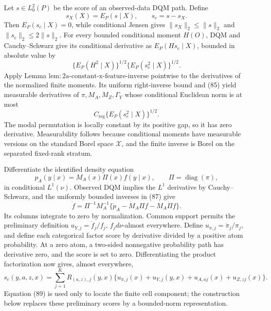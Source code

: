 Let \(s\in L^2_0(P)\) be the score of an observed-data DQM path.  Define
\[
 s_X(X)=E_P(s\mid X),\qquad s_c=s-s_X. \tag{84}
\]
Then \(E_P(s_c\mid X)=0\), while conditional Jensen gives
\(\|s_X\|_2\leq\|s\|_2\) and \(\|s_c\|_2\leq2\|s\|_2\).  For every bounded conditional moment \(H(O)\), DQM and Cauchy--Schwarz give its conditional derivative as \(E_P(Hs_c\mid X)\), bounded in absolute value by
\[
 \{E_P(H^2\mid X)\}^{1/2}\{E_P(s_c^2\mid X)\}^{1/2}. \tag{85}
\]
Apply Lemma \(\mathrm{lem{:}2a\mbox{-}constant\mbox{-}x\mbox{-}feature\mbox{-}inverse}\) pointwise to the derivatives of the normalized finite moments.  Its uniform right-inverse bound and (85) yield measurable derivatives of \(\pi,M_A,M_Z,\Gamma_Y\) whose conditional Euclidean norm is at most
\[
 C_{\mathrm{reg}}\{E_P(s_c^2\mid X)\}^{1/2}. \tag{86}
\]
The modal permutation is locally constant by its positive gap, so it has zero derivative.  Measurability follows because conditional moments have measurable versions on the standard Borel space \(\mathcal X\), and the finite inverse is Borel on the separated fixed-rank stratum.

Differentiate the identified density equation
\[
 p_A(y\mid x)=M_A(x)\Pi(x)f(y\mid x),\qquad
 \Pi=\operatorname{diag}(\pi), \tag{87}
\]
in conditional \(L^1(\nu)\).  Observed DQM implies the \(L^1\) derivative by Cauchy--Schwarz, and the uniformly bounded inverses in (87) give
\[
 \dot f=\Pi^{-1}M_A^{-1}
 \{\dot p_A-\dot M_A\Pi f-M_A\dot\Pi f\}. \tag{88}
\]
Its columns integrate to zero by normalization.  Common support permits the preliminary definition \(u_{Y,j}=\dot f_j/f_j\), \(f_jd\nu\)-almost everywhere.  Define \(u_{\pi,j}=\dot\pi_j/\pi_j\), and define each categorical factor score by derivative divided by a positive atom probability.  At a zero atom, a two-sided nonnegative probability path has derivative zero, and the score is set to zero.  Differentiating the product factorization now gives, almost everywhere,
\[
 s_c(y,a,z,x)=\sum_{j=1}^KR_{(a,z),j}(y,x)
 \{u_{\pi,j}(x)+u_{Y,j}(y,x)+u_{A,aj}(x)+u_{Z,zj}(x)\}. \tag{89}
\]
Equation (89) is used only to locate the finite cell component; the construction below replaces these preliminary scores by a bounded-norm representation.

